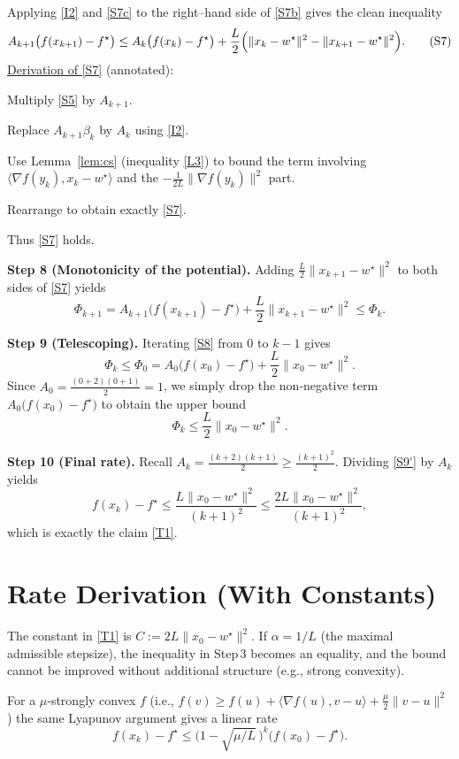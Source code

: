 \documentclass{article}
\newcommand{\grad}{\nabla}
\begin{document}
Applying \eqref{I2} and \eqref{S7c} to the right–hand side of \eqref{S7b}
gives the clean inequality
\[
A_{k+1}\bigl(f(x_{k+1})-f^\star\bigr)
\le A_k\bigl(f(x_k)-f^\star\bigr)
      +\frac{L}{2}\Bigl(\|x_k-w^\star\|^2-\|x_{k+1}-w^\star\|^2\Bigr) .
\tag{S7}
\]
\underline{Derivation of \eqref{S7}} (annotated):
\begin{enumerate}[label={[\arabic*]}, leftmargin=*]
\item Multiply \eqref{S5} by $A_{k+1}$.
\item Replace $A_{k+1}\beta_k$ by $A_k$ using \eqref{I2}.
\item Use Lemma~\ref{lem:cs} (inequality \eqref{L3}) to bound the term
      involving $\langle\grad f(y_k),x_k-w^\star\rangle$ and the
      $-\frac{1}{2L}\|\grad f(y_k)\|^2$ part.
\item Rearrange to obtain exactly \eqref{S7}.
\end{enumerate}
Thus \eqref{S7} holds. \hfill\qedsymbol

\noindent\textbf{Step 8 (Monotonicity of the potential).}  
Adding $\frac{L}{2}\|x_{k+1}-w^\star\|^2$ to both sides of \eqref{S7} yields
\[
\Phi_{k+1}=A_{k+1}\bigl(f(x_{k+1})-f^\star\bigr)+\frac{L}{2}\|x_{k+1}-w^\star\|^2
\le \Phi_k .
\tag{S8}
\]

\noindent\textbf{Step 9 (Telescoping).}  
Iterating \eqref{S8} from $0$ to $k-1$ gives
\[
\Phi_k \le \Phi_0
= A_0\bigl(f(x_0)-f^\star\bigr)+\frac{L}{2}\|x_0-w^\star\|^2 .
\tag{S9}
\]
Since $A_0=\frac{(0+2)(0+1)}{2}=1$, we simply drop the non‑negative term
$A_0\bigl(f(x_0)-f^\star\bigr)$ to obtain the upper bound
\[
\Phi_k \le \frac{L}{2}\|x_0-w^\star\|^2 .
\tag{S9'}
\]

\noindent\textbf{Step 10 (Final rate).}  
Recall $A_k=\frac{(k+2)(k+1)}{2}\ge\frac{(k+1)^2}{2}$.  Dividing \eqref{S9'}
by $A_k$ yields
\[
f(x_k)-f^\star \le
\frac{L\|x_0-w^\star\|^2}{(k+1)^2}
\le \frac{2L\|x_0-w^\star\|^2}{(k+1)^2},
\]
which is exactly the claim \eqref{T1}. \hfill\qedsymbol

\section*{Rate Derivation (With Constants)}
The constant in \eqref{T1} is $C:=2L\|x_0-w^\star\|^2$.  
If $\alpha=1/L$ (the maximal admissible stepsize), the inequality in
Step 3 becomes an equality, and the bound cannot be improved without
additional structure (e.g., strong convexity).

For a $\mu$‑strongly convex $f$ (i.e., $f(v)\ge f(u)+\langle\grad f(u),v-u\rangle+\frac{\mu}{2}\|v-u\|^2$) the same Lyapunov argument gives a linear rate
\[
f(x_k)-f^\star \le \bigl(1-\sqrt{\mu/L}\,\bigr)^k\bigl(f(x_0)-f^\star\bigr).
\]
\end{document}
